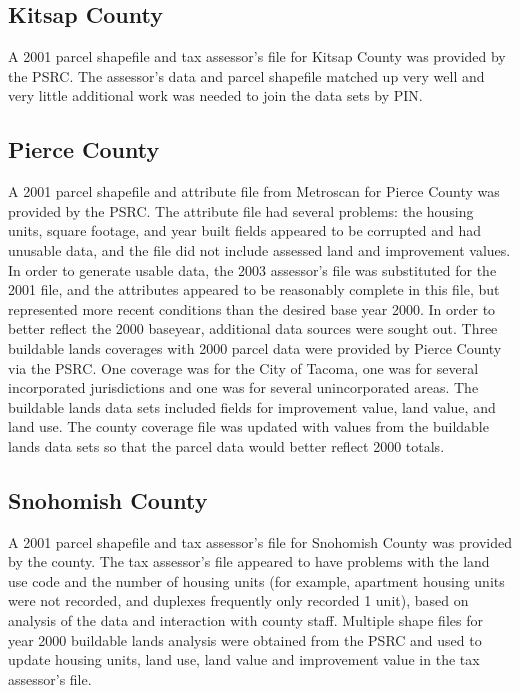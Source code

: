 \subsection{Kitsap County}

A 2001 parcel shapefile and tax assessor's file for Kitsap County
was provided by the PSRC.  The assessor's data and parcel
shapefile matched up very well and very little additional work was
needed to join the data sets by PIN.

\subsection{Pierce County}

A 2001 parcel shapefile and attribute file from Metroscan for
Pierce County was provided by the PSRC.  The attribute file had
several problems:  the housing units, square footage, and year
built fields appeared to be corrupted and had unusable data, and
the file did not include assessed land and improvement values. In
order to generate usable data, the 2003 assessor's file was
substituted for the 2001 file, and the attributes appeared to be
reasonably complete in this file, but represented more recent
conditions than the desired base year 2000.  In order to better
reflect the 2000 baseyear, additional data sources were sought
out.  Three buildable lands coverages with 2000 parcel data were
provided by Pierce County via the PSRC.  One coverage was for the
City of Tacoma, one was for several incorporated jurisdictions and
one was for several unincorporated areas.  The buildable lands
data sets included fields for improvement value, land value, and
land use.  The county coverage file was updated with values from
the buildable lands data sets so that the parcel data would better
reflect 2000 totals.

\subsection{Snohomish County}

A 2001 parcel shapefile and tax assessor's file for Snohomish
County was provided by the county.  The tax assessor's file
appeared to have problems with the land use code and the number of
housing units (for example, apartment housing units were not
recorded, and duplexes frequently only recorded 1 unit), based on
analysis of the data and interaction with county staff.  Multiple
shape files for year 2000 buildable lands analysis were obtained
from the PSRC and used to update housing units, land use, land
value and improvement value in the tax assessor's file.


